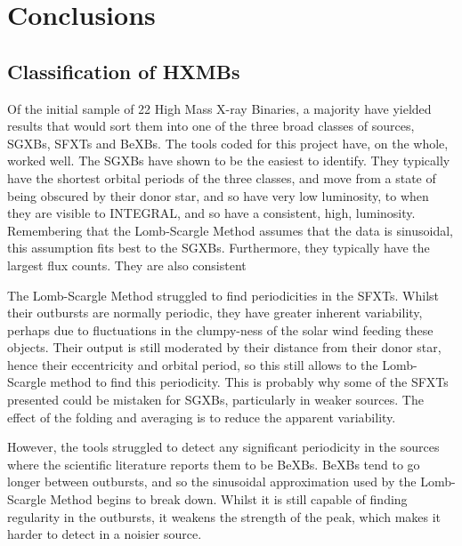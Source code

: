 
\chapter{Conclusions} %

\label{ch:Conclusions} %


\section{Classification of HXMBs}
Of the initial sample of 22 High Mass X-ray Binaries, a majority have yielded results that would sort them into one of the three broad classes of sources, SGXBs, SFXTs and BeXBs. The tools coded for this project have, on the whole, worked well. The SGXBs have shown to be the easiest to identify. They typically have the shortest orbital periods of the three classes, and move from a state of being obscured by their donor star, and so have very low luminosity, to when they are visible to INTEGRAL, and so have a consistent, high, luminosity. Remembering that the Lomb-Scargle Method assumes that the data is sinusoidal, this assumption fits best to the SGXBs. Furthermore, they typically have the largest flux counts. They are also consistent 

The Lomb-Scargle Method struggled to find periodicities in the SFXTs. Whilst their outbursts are normally periodic, they have greater inherent variability, perhaps due to fluctuations in the clumpy-ness of the solar wind feeding these objects. Their output is still moderated by their distance from their donor star, hence their eccentricity and orbital period, so this still allows to the Lomb-Scargle method to find this periodicity. This is probably why some of the SFXTs presented could be mistaken for SGXBs, particularly in weaker sources. The effect of the folding and averaging is to reduce the apparent variability. 

However, the tools struggled to detect any significant periodicity in the sources where the scientific literature reports them to be BeXBs. BeXBs tend to go longer between outbursts, and so the sinusoidal approximation used by the Lomb-Scargle Method begins to break down. Whilst it is still capable of finding regularity in the outbursts, it weakens the strength of the peak, which makes it harder to detect in a noisier source. 

